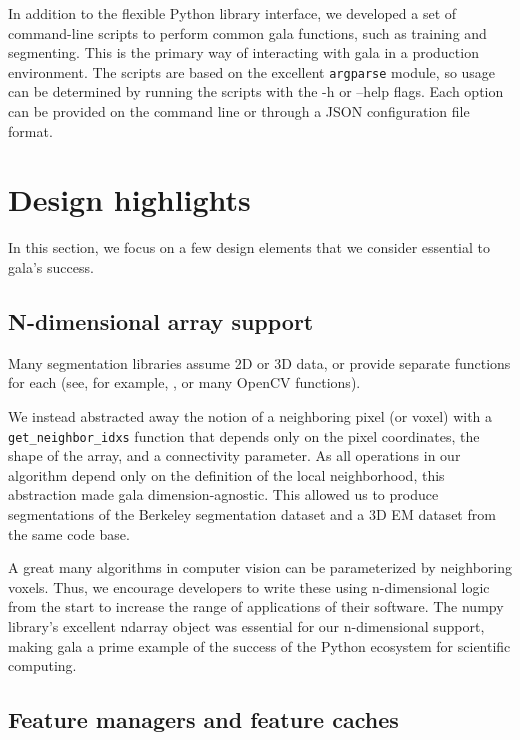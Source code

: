 \documentclass{frontiersSCNS} %
\begin{document}
In addition to the flexible Python library interface, we developed a set of command-line scripts to perform common gala functions, such as training and segmenting.
This is the primary way of interacting with gala in a production environment.
The scripts are based on the excellent \texttt{\small argparse} module, so usage can be determined by running the scripts with the -h or --help flags.
Each option can be provided on the command line or through a JSON configuration file format.


\section{Design highlights}

In this section, we focus on a few design elements that we consider essential to gala's success.

\subsection{N-dimensional array support}

Many segmentation libraries assume 2D or 3D data, or provide separate functions for each (see, for example, \cite{slic-website}, or many OpenCV functions).

We instead abstracted away the notion of a neighboring pixel (or voxel) with a \texttt{\small get\_neighbor\_idxs} function that depends only on the pixel coordinates, the shape of the array, and a connectivity parameter.
As all operations in our algorithm depend only on the definition of the local neighborhood, this abstraction made gala dimension-agnostic.
This allowed us to produce segmentations of the Berkeley segmentation dataset \citep{MartinFTM01} and a 3D EM dataset from the same code base.

A great many algorithms in computer vision can be parameterized by neighboring voxels.
Thus, we encourage developers to write these using n-dimensional logic from the start to increase the range of applications of their software.
The numpy library's excellent ndarray object was essential for our n-dimensional support, making gala a prime example of the success of the Python ecosystem for scientific computing.


\subsection{Feature managers and feature caches}
\label{sec:feature-man}
\end{document}
